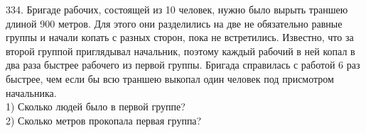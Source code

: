 334. Бригаде рабочих, состоящей из 10 человек, нужно было вырыть траншею длиной 900 метров.
Для этого они разделились на две не обязательно равные группы и начали копать с разных сторон,
пока не встретились. Известно, что за второй группой приглядывал начальник, поэтому каждый
рабочий в ней копал в два раза быстрее рабочего из первой группы. Бригада справилась с работой
6 раз быстрее, чем если бы всю траншею выкопал один человек под присмотром начальника.\\
1) Сколько людей было в первой группе?\\
2) Сколько метров прокопала первая группа?\\
